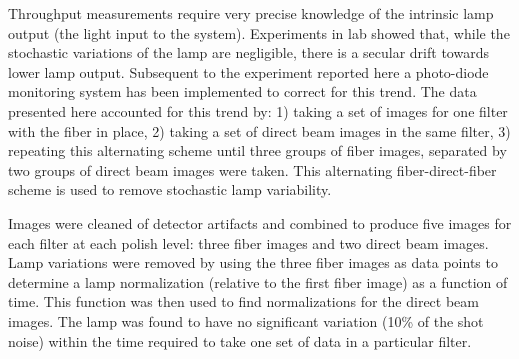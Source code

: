Throughput measurements require very precise knowledge of the
intrinsic lamp output (the light input to the system). Experiments in
lab showed that, while the stochastic variations of the lamp are
negligible, there is a secular drift towards lower lamp
output. Subsequent to the experiment reported here a photo-diode
monitoring system has been implemented to correct for this trend. The
data presented here accounted for this trend by: 1) taking a set of
images for one filter with the fiber in place, 2) taking a set of
direct beam images in the same filter, 3) repeating this alternating
scheme until three groups of fiber images, separated by two groups of
direct beam images were taken. This alternating fiber-direct-fiber
scheme is used to remove stochastic lamp variability.

Images were cleaned of detector artifacts and combined to produce five
images for each filter at each polish level: three fiber images and
two direct beam images. Lamp variations were removed by using the
three fiber images as data points to determine a lamp normalization
(relative to the first fiber image) as a function of time. This
function was then used to find normalizations for the direct beam
images. The lamp was found to have no significant variation (10\% of the shot noise)
 within the time required to take one set of data in a particular filter.


